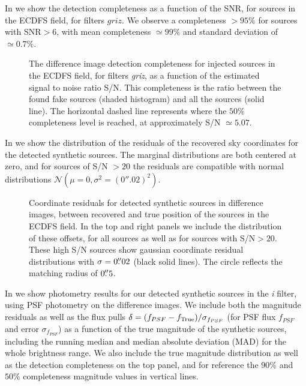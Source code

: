 In  we show the detection completeness as a function of the \gls{SNR}, for sources in the \gls{ECDFS} field, for filters $griz$. 
We observe a completeness $>95\%$ for sources with \gls{SNR}$> 6$, with mean completeness $\simeq 99\%$ and standard deviation of $\simeq 0.7\%$.
%
\begin{figure}[htb!]
\caption{The difference image detection completeness for injected sources in the \gls{ECDFS} field, for filters \textit{griz}, as a function of the estimated signal to noise ratio S/N. This completeness is the ratio between the found fake sources (shaded histogram) and all the sources (solid line). The horizontal dashed line represents where the $50\%$ completeness level is reached, at approximately S/N $\simeq 5.07$.}
\label{fig:eff_snr_griz}
\end{figure}
%
In  we show the distribution of the residuals of the recovered sky coordinates for the detected synthetic sources. The marginal distributions are both centered at zero, and for sources of S/N $>20$ the residuals are compatible with normal distributions $\mathcal{N}(\mu=0, \sigma^2=(0''.02)^2)$.
%
\begin{figure}[htb!]
\caption{Coordinate residuals for detected synthetic sources in difference images, between recovered and true position of the sources in the \gls{ECDFS} field. 
In the top and right panels we include the distribution of these offsets, for all sources as well as for sources with S/N$>20$. 
These high S/N sources show gaussian coordinate residual distributions with $\sigma=0\mbox{$.\!\!^{\prime\prime}$}02$ (black solid lines). 
The circle reflects the matching radius of $0\mbox{$.\!\!^{\prime\prime}$}5$.}
\label{fig:coordinate_offset_diffim_fakes}
\end{figure}
%
In  we show photometry results for our detected synthetic sources in the \textit{i} filter, using \gls{PSF} photometry on the difference images. 
We include both the magnitude residuals as well as the \gls{flux} pulls $\delta = (f_{PSF}-f_{\rm{True}})/\sigma_{f_{PSF}}$ (for PSF \gls{flux} $f_{PSF}$ and error $\sigma_{f_{PSF}}$) as a function of the true magnitude of the synthetic sources, including the running median and median absolute deviation (MAD) for the whole brightness range. 
We also include the true magnitude distribution as well as the detection completeness on the top panel, and for reference the $90\%$ and $50\%$ completeness magnitude values in vertical lines. 
